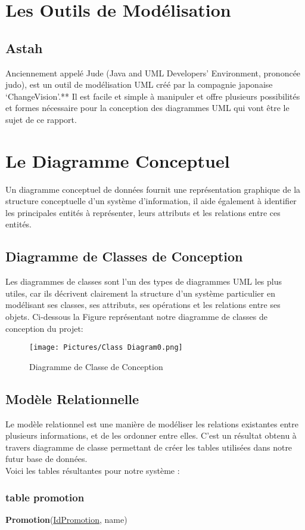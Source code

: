 \documentclass[11pt,fleqn]{book} %
\begin{document}
\section{ Les Outils de Modélisation}
\subsection{Astah}
Anciennement appelé Jude (Java and UML Developers’ 
Environment, prononcée judo), est un outil de modélisation UML créé par la compagnie japonaise ‘ChangeVision’.**
Il est facile et simple à manipuler et offre plusieurs possibilités et formes nécessaire pour la conception des diagrammes UML qui vont être le sujet de ce rapport.
\section{Le Diagramme Conceptuel}
Un diagramme conceptuel de données fournit une représentation graphique de la structure conceptuelle d'un système d'information, il aide également à identifier les principales entités à représenter, leurs attributs et les relations entre ces entités. \\
\subsection{Diagramme de Classes de Conception}
Les diagrammes de classes sont l'un des types de diagrammes UML les plus utiles, car 
ils décrivent clairement la structure d'un système particulier en modélisant ses classes, 
ses attributs, ses opérations et les relations entre ses objets.
Ci-dessous la Figure  représentant notre diagramme de classes de conception du projet: 
\begin{figure}[h]
    \centering
    \texttt{[image: Pictures/Class Diagram0.png]}
    \caption{Diagramme de Classe de Conception}
    \label{fig:pca}
\end{figure}
\subsection{ Modèle Relationnelle }
Le modèle relationnel est une manière de modéliser les relations existantes entre plusieurs informations, et de les ordonner entre elles. C’est un résultat obtenu à travers diagramme de classe permettant de créer les tables utilisées dans notre futur base de données.\\
Voici les tables résultantes pour notre système :
\subsubsection{table promotion}
\hspace{3em}\textbf{Promotion}(\underline{IdPromotion}, name)
\end{document}
